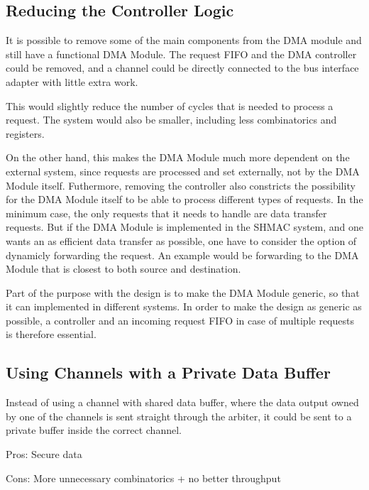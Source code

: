 
\subsection{Reducing the Controller Logic}
It is possible to remove some of the main components from the DMA module and still
have a functional DMA Module. The request FIFO and the DMA controller could be removed,
and a channel could be directly connected to the bus interface adapter with little
extra work.

This would slightly reduce the number of cycles that is needed to process a request.
The system would also be smaller, including less combinatorics and registers.

On the other hand, this makes the DMA Module much more dependent on the external system, since requests are processed and set externally, not by the DMA Module itself.
Futhermore, removing the controller also constricts the possibility for the DMA Module itself to be able to process different types of requests.
In the minimum case, the only requests that it needs to handle are data transfer requests.
But if the DMA Module is implemented in the SHMAC system, and one wants an as efficient data transfer as possible, one have to consider the option of dynamicly forwarding the request.
An example would be forwarding to the DMA Module that is  closest to both source and destination.

Part of the purpose with the design is to make the DMA Module generic, so that it can implemented in different systems.
In order to make the design as generic as possible, a controller and an incoming request FIFO
in case of multiple requests is therefore essential.

\subsection{Using Channels with a Private Data Buffer}
Instead of using a channel with shared data buffer, where the data output owned by
one of the channels is sent straight through the arbiter, it could be sent to a
private buffer inside the correct channel.

Pros: Secure data

Cons: More unnecessary combinatorics + no better throughput

